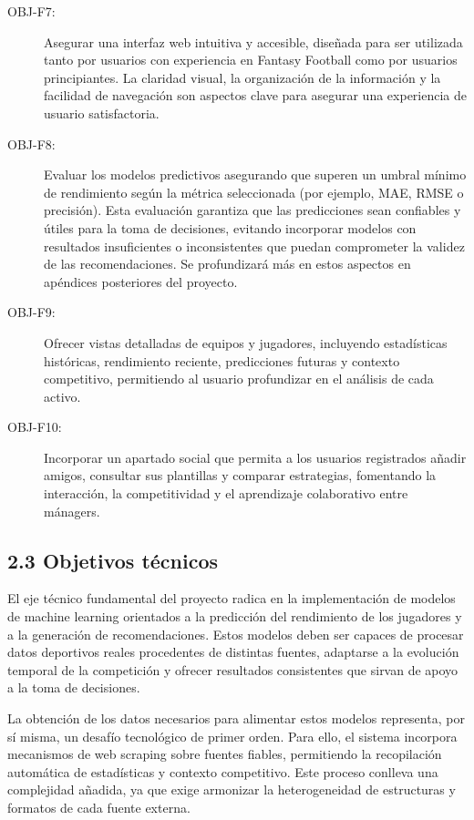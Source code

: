 \begin{description}
\item[OBJ-F7:] Asegurar una interfaz web intuitiva y accesible, diseñada para ser utilizada tanto 
por usuarios con experiencia en Fantasy Football como por usuarios principiantes. La claridad 
visual, la organización de la información y la facilidad de navegación son aspectos clave para 
asegurar una experiencia de usuario satisfactoria.

\item[OBJ-F8:] Evaluar los modelos predictivos asegurando que superen un umbral mínimo de rendimiento 
según la métrica seleccionada (por ejemplo, MAE, RMSE o precisión). Esta evaluación garantiza 
que las predicciones sean confiables y útiles para la toma de decisiones, evitando incorporar 
modelos con resultados insuficientes o inconsistentes que puedan comprometer la validez de las 
recomendaciones. Se profundizará más en estos aspectos en apéndices posteriores del proyecto.

\item[OBJ-F9:] Ofrecer vistas detalladas de equipos y jugadores, incluyendo estadísticas históricas, 
rendimiento reciente, predicciones futuras y contexto competitivo, permitiendo al usuario 
profundizar en el análisis de cada activo.

\item[OBJ-F10:] Incorporar un apartado social que permita a los usuarios registrados añadir amigos, 
consultar sus plantillas y comparar estrategias, fomentando la interacción, la competitividad 
y el aprendizaje colaborativo entre mánagers.
\end{description}

\subsection{2.3 Objetivos técnicos}

El eje técnico fundamental del proyecto radica en la implementación de modelos de machine learning orientados
 a la predicción del rendimiento de los jugadores y a la generación de recomendaciones. Estos modelos deben 
 ser capaces de procesar datos deportivos reales procedentes de distintas fuentes, adaptarse a la evolución 
 temporal de la competición y ofrecer resultados consistentes que sirvan de apoyo a la toma de decisiones.

La obtención de los datos necesarios para alimentar estos modelos representa, por sí misma, un desafío 
tecnológico de primer orden. Para ello, el sistema incorpora mecanismos de web scraping sobre fuentes fiables,
 permitiendo la recopilación automática de estadísticas y contexto competitivo. Este proceso conlleva una
  complejidad añadida, ya que exige armonizar la heterogeneidad de estructuras y formatos de cada fuente 
  externa.

